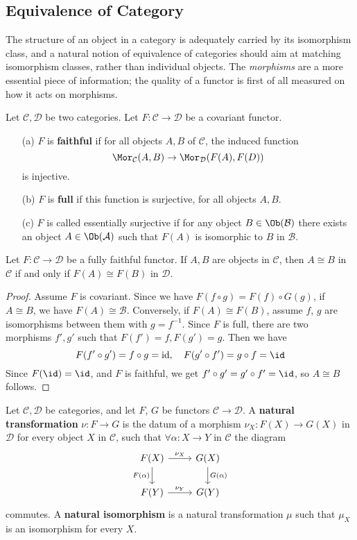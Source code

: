 \subsection{Equivalence of Category}
The structure of an object in a category is adequately carried by its isomorphism class, and a natural notion of equivalence of categories should aim at matching isomorphism classes, rather than individual objects. The \textit{morphisms} are a more essential piece of information; the quality of a functor is first of all measured on how it acts on morphisms.
\begin{definition}
Let $\mathcal{C},\mathcal{D}$ be two categories. Let $F:\mathcal{C}\to\mathcal{D}$ be a covariant functor.
\begin{enumerate}
\item[(a)] $F$ is \textbf{faithful} if for all objects $A,B$ of $\mathcal{C}$, the induced function
\[\Mor_{\mathcal{C}}(A,B)\to\Mor_{\mathcal{D}}(F(A),F(D))\]
is injective.
\item[(b)] $F$ is \textbf{full} if this function is surjective, for all objects $A,B$.
\item[(c)] $F$ is called essentially surjective if for any object $B\in\Ob(\mathcal{B})$ there exists an object $A\in\Ob(\mathcal{A})$ such that $F(A)$ is isomorphic to $B$ in $\mathcal{B}$.
\end{enumerate}
\end{definition}
\begin{lemma}\label{fully faithful fuctor}
Let $F:\mathcal{C}\to\mathcal{D}$ be a fully faithful functor. If $A,B$ are objects in $\mathcal{C}$, then $A\cong B$ in $\mathcal{C}$ if and only if $F(A)\cong F(B)$ in $\mathcal{D}$.
\end{lemma}
\begin{proof}
Assume $F$ is covariant. Since we have $F(f\circ g)=F(f)\circ G(g)$, if $A\cong B$, we have $F(A)\cong\mathscr{B}$. Conversely, if $F(A)\cong F(B)$, assume $f$, $g$ are isomorphisms between them with $g=f^{-1}$. Since $F$ is full, there are two morphisms $f',g'$ such that $F(f')=f,F(g')=g$. Then we have
\[F(f'\circ g')=f\circ g=\mathrm{id},\quad F(g'\circ f')=g\circ f=\id\]
Since $F(\id)=\id$, and $F$ is faithful, we get $f'\circ g'=g'\circ f'=\id$, so $A\cong B$ follows.
\end{proof}
\begin{definition}
Let $\mathcal{C}, \mathcal{D}$ be categories, and let $F$, $G$ be functors $\mathcal{C}\to\mathcal{D}$. A \textbf{natural transformation} $\nu:F\to G$ is the datum of a morphism $\nu_X:F(X)\to G(X)$ in $\mathcal{D}$ for every object $X$ in $\mathcal{C}$, such that $\forall\alpha:X\to Y$ in $\mathcal{C}$ the diagram
\[\begin{tikzcd}
F(X)\ar[r,"\nu_X"]\ar[d,swap,"F(\alpha)"]&G(X)\ar[d,"G(\alpha)"]\\
F(Y)\ar[r,"\nu_Y"]&G(Y)
\end{tikzcd}\]
commutes. A \textbf{natural isomorphism} is a natural transformation $\mu$ such that $\mu_X$ is an isomorphism for every $X$.
\end{definition}
